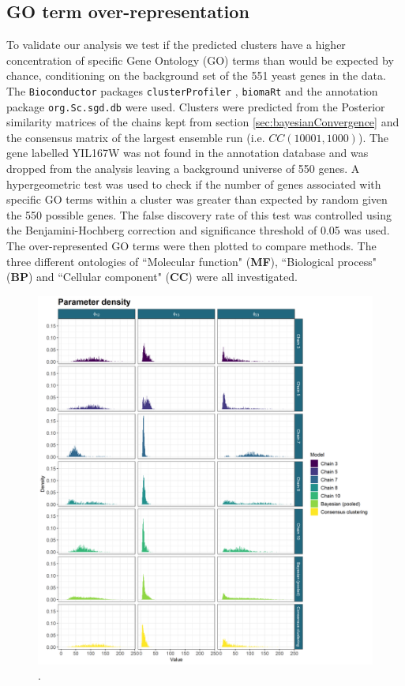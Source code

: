 \documentclass[]{article}
\begin{document}
\subsection{GO term over-representation} \label{sec:goTermOverRep}
To validate our analysis we test if the predicted clusters have a higher concentration of specific  Gene Ontology (GO) terms than would be expected by chance, conditioning on the background set of the 551 yeast genes in the data. The \texttt{Bioconductor} packages \texttt{clusterProfiler} \citep{yu2012clusterProfiler}, \texttt{biomaRt} \citep{durinck2009mapping} and the annotation package \texttt{org.Sc.sgd.db} \citep{carlson2014org} were used. Clusters were predicted from the Posterior similarity matrices of the chains kept from section \ref{sec:bayesianConvergence} and the consensus matrix of the largest ensemble run (i.e. $CC(10001, 1000)$). The gene labelled YIL167W was not found in the annotation database and was dropped from the analysis leaving a background universe of 550 genes. A hypergeometric test was used to check if the number of genes associated with specific GO terms within a cluster was greater than expected by random given the 550 possible genes. The false discovery rate of this test was controlled using the Benjamini-Hochberg correction \citep{benjamini1995controlling} and significance threshold of 0.05 was used. The over-represented GO terms were then plotted to compare methods. The three different ontologies of ``Molecular function" (\textbf{MF}), ``Biological process" (\textbf{BP}) and ``Cellular component" (\textbf{CC}) were all investigated.

\begin{figure}
	\centering
	\includegraphics[scale=0.6]{./Images/Yeast/ComparisonDensities.png}
	\caption{.}
	\label{fig:yeastGOMF}
\end{figure}


  
\end{document}
